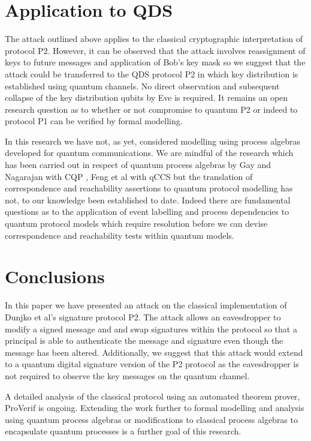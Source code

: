 \documentclass[english]{article}
\begin{document}
\section{Application to QDS }

The attack outlined above applies to the classical cryptographic interpretation
of protocol P2. However, it can be observed that the attack involves
reassignment of keys to future messages and application of Bob's key
mask so we suggest that the attack could be transferred to the QDS
protocol P2 in which key distribution is established using quantum
channels. No direct observation and subsequent collapse of the key
distribution qubits by Eve is required. It remains an open research
question as to whether or not compromise to quantum P2 or indeed to
protocol P1 can be verified by formal modelling.

In this research we have not, as yet, considered modelling using process
algebras developed for quantum communications. We are mindful of the
research which has been carried out in respect of quantum process
algebras by Gay and Nagarajan with CQP \cite{Gay2005}, Feng et al
with qCCS \cite{Ying2009} but the translation of correspondence and
reachability assertions to quantum protocol modelling has not, to
our knowledge been established to date. Indeed there are fundamental
questions as to the application of event labelling and process dependencies
to quantum protocol models which require resolution before we can
devise correspondence and reachability tests within quantum models.


\section{Conclusions}

In this paper we have presented an attack on the classical implementation
of Dunjko et al's signature protocol P2. The attack allows an eavesdropper
to modify a signed message and and swap signatures within the protocol
so that a principal is able to authenticate the message and signature
even though the message has been altered. Additionally, we suggest
that this attack would extend to a quantum digital signature version
of the P2 protocol as the eavesdropper is not required to observe
the key messages on the quantum channel.

A detailed analysis of the classical protocol using an automated theorem
prover, ProVerif is ongoing. Extending the work further to formal
modelling and analysis using quantum process algebras or modifications
to classical process algebras to encapsulate quantum processes is
a further goal of this research.



\end{document}
